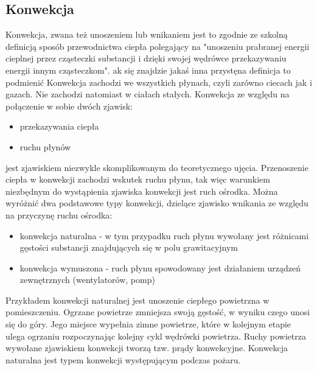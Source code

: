 \subsection{Konwekcja}
\label{Konwekcja}
Konwekcja, zwana też unoszeniem lub wnikaniem jest to zgodnie ze szkolną definicją sposób przewodnictwa ciepła polegający na
"unoszeniu prabranej energii cieplnej przez cząsteczki substancji i dzięki swojej wędrówce przekazywaniu
energii innym cząsteczkom". 
ak się znajdzie jakaś inna przystęna definicja to podmienić
Konwekcja zachodzi we wszystkich płynach, czyli zarówno ciecach jak i gazach. Nie zachodzi natomiast w ciałach stałych.
Konwekcja ze względu na połączenie w sobie dwóch zjawisk: 
\begin{itemize}
\item przekazywania ciepła
\item ruchu płynów
\end{itemize}
jest zjawiskiem niezwykle skomplikowanym do teoretycznego ujęcia. Przenoszenie ciepła w konwekcji zachodzi 
wskutek ruchu płynu, tak więc warunkiem niezbędnym do wystąpienia zjawiska konwekcji jest ruch ośrodka.
Można wyróżnić dwa podstawowe typy konwekcji, dzielące zjawisko wnikania ze względu na przyczynę ruchu ośrodka:
\begin{itemize}
\item konwekcja naturalna - w tym przypadku ruch płynu wywołany jest różnicami gęstości substancji znajdujących się w polu grawitacyjnym
\item konwekcja wymuszona - ruch płynu spowodowany jest działaniem urządzeń zewnętrznych (wentylatorów, pomp)
\end {itemize}
Przykładem konwekcji naturalnej jest unoszenie ciepłego powietrzna w pomieszczeniu. 
Ogrzane powietrze zmniejsza swoją gęstość, w wyniku czego unosi się do góry. Jego miejsce wypełnia zimne powietrze, 
które w kolejnym etapie ulega ogrzaniu rozpoczynając kolejny cykl wędrówki powietrza. Ruchy powietrza wywołane zjawiskiem 
konwekcji tworzą tzw. prądy konwekcyjne.
 Konwekcja naturalna jest typem konwekcji występującym podczas pożaru. 

